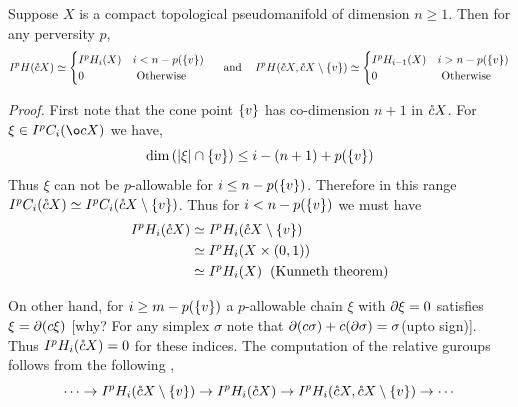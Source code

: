 \documentclass[11pt]{article}
\begin{document}
\begin{Thm}{}{}
    \hspace*{0.1cm} Suppose $X$ is a compact topological pseudomanifold of dimension $n \geq 1$. Then for any perversity $p$, \[I^pH(\mathring{c} X) \simeq \begin{cases}
        I^pH_i(X) & i < n -p(\qty{v})\\
        0 & \text{ Otherwise }
    \end{cases}  \hspace*{0.4cm} \text{ and } \hspace*{0.3cm} I^pH(\mathring{c} X, \mathring{c} X \setminus \qty{v}) \simeq \begin{cases}
        I^pH_{i-1}(X) & i > n -p(\qty{v})\\
        0 & \text{ Otherwise }
    \end{cases} \]
\end{Thm}

\noindent \textit{Proof.} First note that the cone point $\qty{v}$ has co-dimension $n+1$ in $\mathring{c} X$. For $\xi \in I^pC_i(\o c X)$ we have, \[ \dim \qty(\abs{\xi}\cap \qty{v}) \leq i - (n+1)+p(\qty{v})\] Thus $\xi$ can not be $p$-allowable for $i \leq n-p(\qty{v})$. Therefore in this range $I^pC_i(\mathring{c} X)\simeq I^pC_i(\mathring{c} X \setminus \qty{v})$. Thus for $i < n- p(\qty{v})$ we must have \begin{align*}
    I^pH_i(\mathring{c} X) &\simeq I^pH_i(\mathring{c} X \setminus \qty{v}) \\
    & \simeq I^pH_i(X \times (0,1)) \\
    & \simeq I^pH_i(X) \hspace*{0.2cm} \text{(Kunneth theorem)}
\end{align*}

\noindent On other hand, for $i \geq m - p(\qty{v})$ a $p$-allowable chain $\xi$ with $\partial \xi=0$ satisfies $\xi = \partial (c \xi)$ [why? For any simplex $\sigma$ note that $ \partial(c \sigma)+ c (\partial \sigma) = \sigma$(upto sign)]. Thus $I^pH_i(\mathring{c} X) =0$ for these indices. The computation of the  relative guroups follows from the following \les, 
\[
  \cdots  \to I^pH_i(\mathring{c} X \setminus \qty{v}) \to I^pH_i(\mathring{c} X) \to I^pH_i(\mathring{c} X, \mathring{c} X \setminus \qty{v}) \to \cdots     
\]

\end{document}
